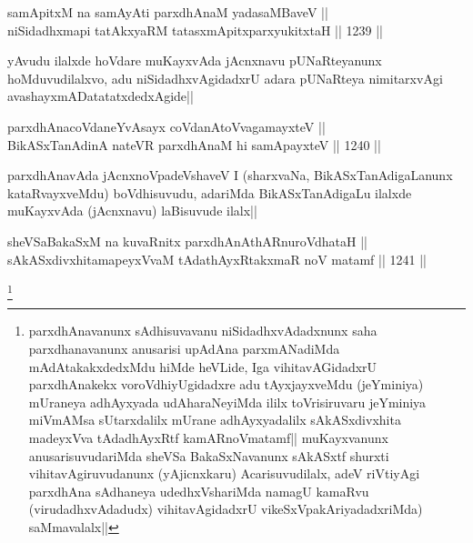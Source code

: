 
\begin{shl}
samApitxM na samAyAti parxdhAnaM yadasaMBaveV || \\
niSidadhxmapi tatAkxyaRM tatasxmApitxparxyukitxtaH ||  1239 ||  
\end{shl}

\begin{artha}
yAvudu ilalxde hoVdare muKayxvAda jAcnxnavu pUNaRteyanunx hoMduvudilalxvo, adu niSidadhxvAgidadxrU adara pUNaRteya nimitarxvAgi avashayxmADatatatxdedxAgide||
\end{artha}


\begin{shl}
parxdhAnacoVdaneYvAsayx coVdanAtoV\s vagamayxteV || \\
BikASxTanAdinA nateVR parxdhAnaM hi samApayxteV ||  1240 ||  
\end{shl}

\begin{artha}
parxdhAnavAda jAcnxnoVpadeVshaveV I (sharxvaNa, BikASxTanAdigaLanunx kataRvayxveMdu) boVdhisuvudu, adariMda BikASxTanAdigaLu  ilalxde muKayxvAda (jAcnxnavu) laBisuvude ilalx||
\end{artha}

\begin{shl}
sheVSaBakaSxM na kuvaRnitx parxdhAnAthARnuroVdhataH || \\
sAkASxdivxhitamapeyxVvaM tAdathAyxRtakxmaR noV matamf ||  1241 ||  
\end{shl}

\begin{artha}
\footnote{parxdhAnavanunx sAdhisuvavanu niSidadhxvAdadxnunx saha parxdhanavanunx anusarisi upAdAna parxmANadiMda mAdAtakakxdedxMdu hiMde heVLide, Iga vihitavAGidadxrU parxdhAnakekx voroVdhiyUgidadxre adu tAyxjayxveMdu (jeYminiya) mUraneya adhAyxyada udAharaNeyiMda ililx toVrisiruvaru jeYminiya miVmAMsa sUtarxdalilx mUrane adhAyxyadalilx sAkASxdivxhita madeyxVva tAdadhAyxRtf kamARnoVmatamf|| muKayxvanunx anusarisuvudariMda sheVSa BakaSxNavanunx sAkASxtf shurxti vihitavAgiruvudanunx (yAjicnxkaru) Acarisuvudilalx, adeV riVtiyAgi parxdhAna sAdhaneya udedhxVshariMda namagU kamaRvu (virudadhxvAdadudx) vihitavAgidadxrU vikeSxVpakAriyadadxriMda) saMmavalalx||}
\end{artha}


